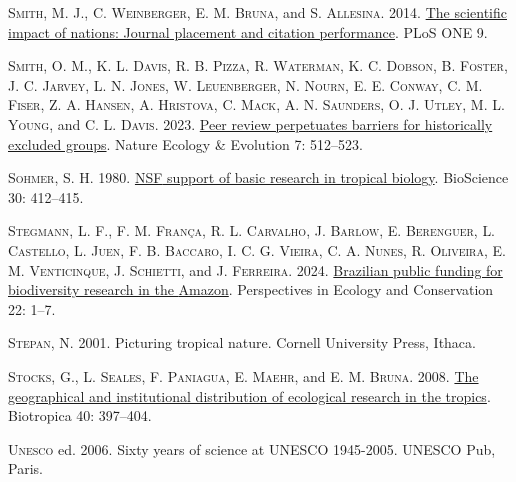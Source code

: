 \documentclass[
  12pt,
  man, donotrepeattitle,floatsintext]{apa6}
\newlength{\cslhangindent}
\newlength{\cslentryspacingunit} %
\newenvironment{CSLReferences}[2] %
 {%
  \setlength{\parindent}{0pt}
  \ifodd #1
  \let\oldpar\par
  \def\par{\hangindent=\cslhangindent\oldpar}
  \fi
  \setlength{\parskip}{#2\cslentryspacingunit}
 }%
 {}
\begin{document}
\begin{CSLReferences}{1}{0}
\leavevmode{}%
\textsc{Smith, M. J.}, \textsc{C. Weinberger}, \textsc{E. M. Bruna}, and \textsc{S. Allesina}. 2014. \href{https://doi.org/10.1371/journal.pone.0109195}{The scientific impact of nations: Journal placement and citation performance}. PLoS ONE 9.

\leavevmode{}%
\textsc{Smith, O. M.}, \textsc{K. L. Davis}, \textsc{R. B. Pizza}, \textsc{R. Waterman}, \textsc{K. C. Dobson}, \textsc{B. Foster}, \textsc{J. C. Jarvey}, \textsc{L. N. Jones}, \textsc{W. Leuenberger}, \textsc{N. Nourn}, \textsc{E. E. Conway}, \textsc{C. M. Fiser}, \textsc{Z. A. Hansen}, \textsc{A. Hristova}, \textsc{C. Mack}, \textsc{A. N. Saunders}, \textsc{O. J. Utley}, \textsc{M. L. Young}, and \textsc{C. L. Davis}. 2023. \href{https://doi.org/10.1038/s41559-023-01999-w}{Peer review perpetuates barriers for historically excluded groups}. Nature Ecology \& Evolution 7: 512--523.

\leavevmode{}%
\textsc{Sohmer, S. H.} 1980. \href{https://doi.org/10.2307/1308006}{{NSF} support of basic research in tropical biology}. BioScience 30: 412--415.

\leavevmode{}%
\textsc{Stegmann, L. F.}, \textsc{F. M. França}, \textsc{R. L. Carvalho}, \textsc{J. Barlow}, \textsc{E. Berenguer}, \textsc{L. Castello}, \textsc{L. Juen}, \textsc{F. B. Baccaro}, \textsc{I. C. G. Vieira}, \textsc{C. A. Nunes}, \textsc{R. Oliveira}, \textsc{E. M. Venticinque}, \textsc{J. Schietti}, and \textsc{J. Ferreira}. 2024. \href{https://doi.org/10.1016/j.pecon.2024.01.003}{Brazilian public funding for biodiversity research in the {Amazon}}. Perspectives in Ecology and Conservation 22: 1--7.

\leavevmode{}%
\textsc{Stepan, N.} 2001. Picturing tropical nature. Cornell University Press, Ithaca.

\leavevmode{}%
\textsc{Stocks, G.}, \textsc{L. Seales}, \textsc{F. Paniagua}, \textsc{E. Maehr}, and \textsc{E. M. Bruna}. 2008. \href{https://doi.org/10.1111/j.1744-7429.2007.00393.x}{The geographical and institutional distribution of ecological research in the tropics}. Biotropica 40: 397--404.

\leavevmode{}%
\textsc{Unesco} ed. 2006. Sixty years of science at {UNESCO} 1945-2005. UNESCO Pub, Paris.


\end{CSLReferences}
\end{document}
